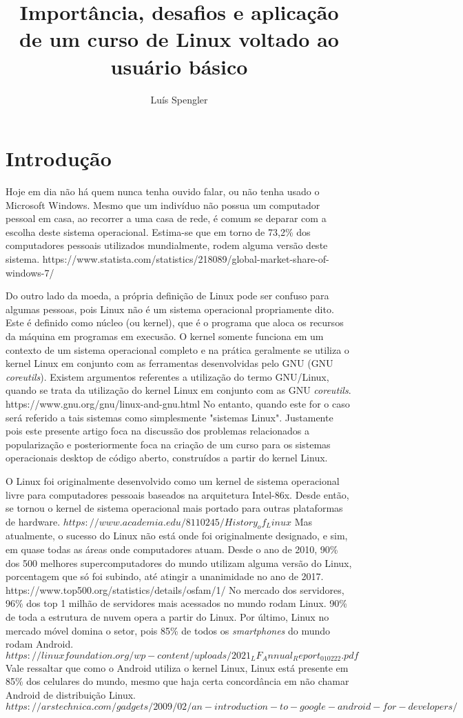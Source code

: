 \documentclass{article}
\title{Importância, desafios e aplicação de um curso de Linux voltado ao usuário básico}
\date{}
\author[1]{Luís Spengler}
\affil[1]{Instituto Federal de Educação, Ciência e Tecnologia de Mato Grosso do Sul}
\begin{document}
\maketitle

\section{Introdução}
Hoje em dia não há quem nunca tenha ouvido falar, ou não tenha usado o Microsoft Windows. Mesmo que um indivíduo não possua um computador pessoal em casa, ao recorrer a uma casa de rede, é comum se deparar com a escolha deste sistema operacional. Estima-se que em torno de 73,2\% dos computadores pessoais utilizados mundialmente, rodem alguma versão deste sistema. https://www.statista.com/statistics/218089/global-market-share-of-windows-7/

Do outro lado da moeda, a própria definição de Linux pode ser confuso para algumas pessoas, pois Linux não é um sistema operacional propriamente dito. Este é definido como núcleo (ou kernel), que é o programa que aloca os recursos da máquina em programas em execusão. O kernel somente funciona em um contexto de um sistema operacional completo e na prática geralmente se utiliza o kernel Linux em conjunto com as ferramentas desenvolvidas pelo GNU (GNU \textit{coreutils}). Existem argumentos referentes a utilização do termo GNU/Linux, quando se trata da utilização do kernel Linux em conjunto com as GNU \textit{coreutils}. https://www.gnu.org/gnu/linux-and-gnu.html No entanto, quando este for o caso será referido a tais sistemas como simplesmente "sistemas Linux". Justamente pois este presente artigo foca na discussão dos problemas relacionados a popularização e posteriormente foca na criação de um curso para os sistemas operacionais desktop de código aberto, construídos a partir do kernel Linux.

O Linux foi originalmente desenvolvido como um kernel de sistema operacional livre para computadores pessoais baseados na arquitetura Intel-86x. Desde então, se tornou o kernel de sistema operacional mais portado para outras plataformas de hardware. \(https://www.academia.edu/8110245/History_of_Linux\) Mas atualmente, o sucesso do Linux não está onde foi originalmente designado, e sim, em quase todas as áreas onde computadores atuam. Desde o ano de 2010, 90\% dos 500 melhores supercomputadores do mundo utilizam alguma versão do Linux, porcentagem que só foi subindo, até atingir a unanimidade no ano de 2017. https://www.top500.org/statistics/details/osfam/1/ No mercado dos servidores, 96\% dos top 1 milhão de servidores mais acessados no mundo rodam Linux. 90\% de toda a estrutura de nuvem opera a partir do Linux. Por último, Linux no mercado móvel domina o setor, pois 85\% de todos os \textit{smartphones} do mundo rodam Android. \(https://linuxfoundation.org/wp-content/uploads/2021_LF_Annual_Report_010222.pdf\) Vale ressaltar que como o Android utiliza o kernel Linux, Linux está presente em 85\% dos celulares do mundo, mesmo que haja certa concordância em não chamar Android de distribuição Linux. \(https://arstechnica.com/gadgets/2009/02/an-introduction-to-google-android-for-developers/\)
\end{document}
